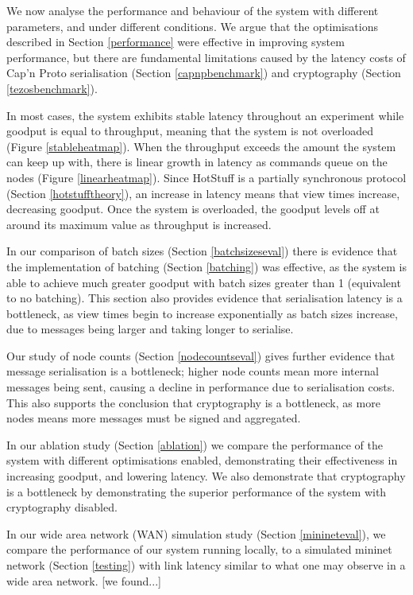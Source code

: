 We now analyse the performance and behaviour of the system with different parameters, and under different conditions. We argue that the optimisations described in Section \ref{performance} were effective in improving system performance, but there are fundamental limitations caused by the latency costs of Cap'n Proto serialisation (Section \ref{capnpbenchmark}) and cryptography (Section \ref{tezosbenchmark}).

In most cases, the system exhibits stable latency throughout an experiment while goodput is equal to throughput, meaning that the system is not overloaded (Figure \ref{stableheatmap}). When the throughput exceeds the amount the system can keep up with, there is linear growth in latency as commands queue on the nodes (Figure \ref{linearheatmap}). Since HotStuff is a partially synchronous protocol (Section \ref{hotstufftheory}), an increase in latency means that view times increase, decreasing goodput. Once the system is overloaded, the goodput levels off at around its maximum value as throughput is increased.

In our comparison of batch sizes (Section \ref{batchsizeseval}) there is evidence that the implementation of batching (Section \ref{batching}) was effective, as the system is able to achieve much greater goodput with batch sizes greater than 1 (equivalent to no batching). This section also provides evidence that serialisation latency is a bottleneck, as view times begin to increase exponentially as batch sizes increase, due to messages being larger and taking longer to serialise.

Our study of node counts (Section \ref{nodecountseval}) gives further evidence that message serialisation is a bottleneck; higher node counts mean more internal messages being sent, causing a decline in performance due to serialisation costs. This also supports the conclusion that cryptography is a bottleneck, as more nodes means more messages must be signed and aggregated.

In our ablation study (Section \ref{ablation}) we compare the performance of the system with different optimisations enabled, demonstrating their effectiveness in increasing goodput, and lowering latency. We also demonstrate that cryptography is a bottleneck by demonstrating the superior performance of the system with cryptography disabled.

In our wide area network (WAN) simulation study (Section \ref{minineteval}), we compare the performance of our system running locally, to a simulated mininet network (Section \ref{testing}) with link latency similar to what one may observe in a wide area network. [we found...]

